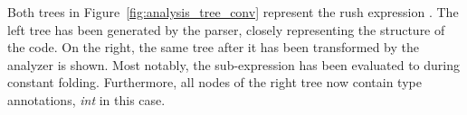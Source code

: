 Both trees in Figure~\ref{fig:analysis_tree_conv} represent the rush expression .
The left tree has been generated by the parser, closely representing the structure of the code.
On the right, the same tree after it has been transformed by the analyzer is shown.
Most notably, the sub-expression  has been evaluated to  during constant folding.
Furthermore, all nodes of the right tree now contain type annotations, \emph{int} in this case.
